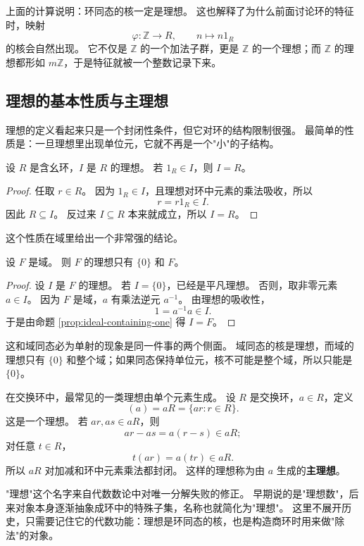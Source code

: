 上面的计算说明：环同态的核一定是理想。
这也解释了为什么前面讨论环的特征时，映射
\[
\varphi:\mathbb Z\to R,\qquad n\mapsto n1_R
\]
的核会自然出现。
它不仅是 $\mathbb Z$ 的一个加法子群，更是 $\mathbb Z$ 的一个理想；而 $\mathbb Z$ 的理想都形如 $m\mathbb Z$，于是特征就被一个整数记录下来。

\subsection{理想的基本性质与主理想}\label{sec:ideal-basic-properties}

理想的定义看起来只是一个封闭性条件，但它对环的结构限制很强。
最简单的性质是：一旦理想里出现单位元，它就不再是一个"小"的子结构。

\begin{proposition}[含有单位元的理想]\label{prop:ideal-containing-one}
设 $R$ 是含幺环，$I$ 是 $R$ 的理想。
若 $1_R\in I$，则 $I=R$。
\end{proposition}

\begin{proof}
任取 $r\in R$。
因为 $1_R\in I$，且理想对环中元素的乘法吸收，所以
\[
r=r1_R\in I.
\]
因此 $R\subseteq I$。
反过来 $I\subseteq R$ 本来就成立，所以 $I=R$。
\end{proof}

这个性质在域里给出一个非常强的结论。

\begin{proposition}[域只有平凡理想]\label{prop:field-ideals}
设 $F$ 是域。
则 $F$ 的理想只有 $\{0\}$ 和 $F$。
\end{proposition}

\begin{proof}
设 $I$ 是 $F$ 的理想。
若 $I=\{0\}$，已经是平凡理想。
否则，取非零元素 $a\in I$。
因为 $F$ 是域，$a$ 有乘法逆元 $a^{-1}$。
由理想的吸收性，
\[
1=a^{-1}a\in I.
\]
于是由命题 \ref{prop:ideal-containing-one} 得 $I=F$。
\end{proof}

这和域同态必为单射的现象是同一件事的两个侧面。
域同态的核是理想，而域的理想只有 $\{0\}$ 和整个域；如果同态保持单位元，核不可能是整个域，所以只能是 $\{0\}$。

在交换环中，最常见的一类理想由单个元素生成。
设 $R$ 是交换环，$a\in R$，定义
\[
(a)=aR=\{ar:r\in R\}.
\]
这是一个理想。
若 $ar,as\in aR$，则
\[
ar-as=a(r-s)\in aR;
\]
对任意 $t\in R$，
\[
t(ar)=a(tr)\in aR.
\]
所以 $aR$ 对加减和环中元素乘法都封闭。
这样的理想称为由 $a$ 生成的\textbf{主理想}。

"理想"这个名字来自代数数论中对唯一分解失败的修正。
早期说的是"理想数"，后来对象本身逐渐抽象成环中的特殊子集，名称也就简化为"理想"。
这里不展开历史，只需要记住它的代数功能：理想是环同态的核，也是构造商环时用来做"除法"的对象。

